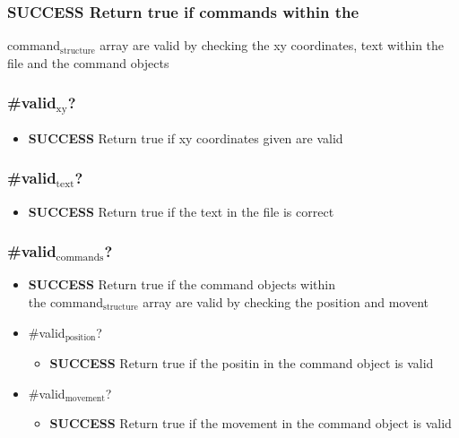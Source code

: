 \documentclass{article}
\begin{document}
\subsubsection{\textbf{SUCCESS} Return true if commands within the}
\label{sec-4-2-1}

        command$_{\mathrm{structure}}$ array are valid
        by checking the xy coordinates, text
        within the file and the command objects
\subsubsection{\#valid$_{\mathrm{xy}}$?}
\label{sec-4-2-2}
\begin{itemize}

\item \textbf{SUCCESS} Return true if xy coordinates given are valid\\
\label{sec-4-2-2-1}%
\end{itemize} %
\subsubsection{\#valid$_{\mathrm{text}}$?}
\label{sec-4-2-3}
\begin{itemize}

\item \textbf{SUCCESS} Return true if the text in the file is correct\\
\label{sec-4-2-3-1}%
\end{itemize} %
\subsubsection{\#valid$_{\mathrm{commands}}$?}
\label{sec-4-2-4}
\begin{itemize}

\item \textbf{SUCCESS} Return true if the command objects within\\
\label{sec-4-2-4-1}%
the command$_{\mathrm{structure}}$ array are valid
          by checking the position and movent

\item \#valid$_{\mathrm{position}}$?
\label{sec-4-2-4-2}%
\begin{itemize}

\item \textbf{SUCCESS} Return true if the positin in the command object is valid\\
\label{sec-4-2-4-2-1}%
\end{itemize} %

\item \#valid$_{\mathrm{movement}}$?
\label{sec-4-2-4-3}%
\begin{itemize}

\item \textbf{SUCCESS} Return true if the movement in the command object is valid\\
\label{sec-4-2-4-3-1}%
\end{itemize} %
\end{itemize} %
\end{document}
